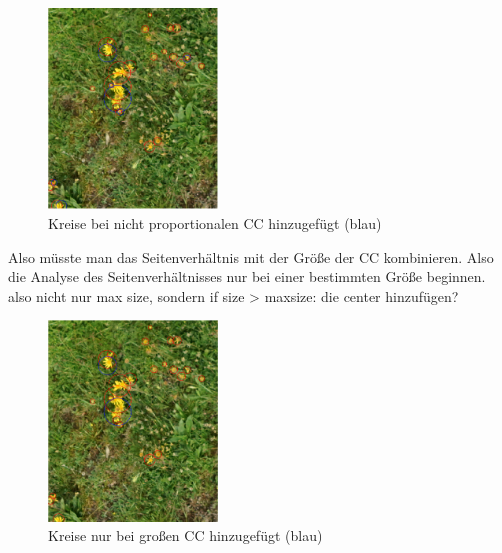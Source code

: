 \begin{figure}[htb]
 \centering
 \includegraphics[width=0.4\textwidth,angle=0]{abb/ergebnisse/probleme/circles}
 \caption{Kreise bei nicht proportionalen CC hinzugefügt (blau)}
\label{fig:Kreis-blau}
\end{figure}

Also müsste man das Seitenverhältnis mit der Größe der CC kombinieren. Also die Analyse des Seitenverhältnisses nur bei einer bestimmten Größe beginnen. 
also nicht nur max size, sondern if size > maxsize: die center hinzufügen?

%
%
%

\begin{figure}[htb]
 \centering
 \includegraphics[width=0.4\textwidth,angle=0]{abb/ergebnisse/probleme/circles-adjust2}
 \caption{Kreise nur bei großen CC hinzugefügt (blau)}
\label{fig:Kreis-blau2}
\end{figure}

